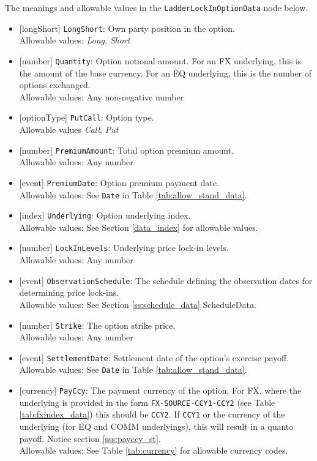 The meanings and allowable values in the \lstinline!LadderLockInOptionData! node below.

\begin{itemize}
  \item{}[longShort] \lstinline!LongShort!: Own party position in the option. \\
  Allowable values: \emph{Long}, \emph{Short}
  \item{}[number] \lstinline!Quantity!: Option notional amount. For an FX underlying, this is the amount of
  the base currency. For an EQ underlying, this is the number of options exchanged. \\
  Allowable values: Any non-negative number
  \item{}[optionType] \lstinline!PutCall!: Option type. \\
  Allowable values \emph{Call}, \emph{Put}
  \item{}[number] \lstinline!PremiumAmount!: Total option premium amount. \\
  Allowable values: Any number
  \item{}[event] \lstinline!PremiumDate!: Option premium payment date. \\
  Allowable values: See \lstinline!Date! in Table \ref{tab:allow_stand_data}.
  \item{}[index] \lstinline!Underlying!: Option underlying index. \\
  Allowable values: See Section \ref{data_index} for allowable values.
  \item{}[number] \lstinline!LockInLevels!: Underlying price lock-in levels. \\
  Allowable values: Any number
  \item{}[event] \lstinline!ObservationSchedule!: The schedule defining the observation dates for determining price lock-ins. \\
  Allowable values: See Section \ref{ss:schedule_data} ScheduleData.
  \item{}[number] \lstinline!Strike!: The option strike price. \\
  Allowable values: Any number
  \item{}[event] \lstinline!SettlementDate!: Settlement date of the option's exercise payoff. \\
  Allowable values: See \lstinline!Date! in Table \ref{tab:allow_stand_data}.
  \item{}[currency] \lstinline!PayCcy!: The payment currency of the option. For FX, where the underlying is provided
      in the form \lstinline!FX-SOURCE-CCY1-CCY2! (see Table \ref{tab:fxindex_data}) this should
      be \lstinline!CCY2!. If \lstinline!CCY1! or the currency of the underlying (for EQ and
      COMM underlyings), this will result in a quanto payoff. Notice section \ref{sss:payccy_st}. \\
        Allowable values: See Table \ref{tab:currency} for allowable currency codes.
\end{itemize}

